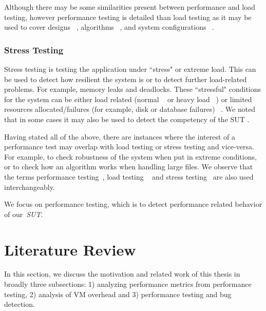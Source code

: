 Although there may be some similarities present between performance and load testing, however performance testing is detailed than load testing as it may be used to cover designs ~\cite{csurgay1999performance,denaro2004early,denaro2005performance}, algorithms ~\cite{cangussu2009segment,cangussu2007reducing}, and system configurations ~\cite{hoskins2005software,pozin2011models,sopitkamol2005method}. 

\subsubsection{Stress Testing}

Stress testing is testing the application under ``stress" or extreme load. This can be used to detect how resilient the system is or to detect further load-related problems. For example, memory leaks and deadlocks. These ``stressful" conditions for the system can be either load related (normal ~\cite{zhang2002automated,kalita2011investigation,chakravarty2010stress} or heavy load ~\cite{Dillenseger2009,kalita2011investigation,huebner2001performance}) or limited resources allocated/failures (for example, disk or database failures) ~\cite{acharya2009mining}. We noted that in some cases it may also be used to detect the competency of the SUT \cite{garousi2010genetic,garousi2008empirical,garousi2006traffic,garousi2008traffic}.


Having stated all of the above, there are instances where the interest of a performance test may overlap with load testing or stress testing and vice-versa. For example, to check robustness of the system when put in extreme conditions, or to check how an algorithm works when handling large files. We observe that the terms performance testing~\cite{Dillenseger2009,Menasce02loadtesting,Menasce:2002}, load testing ~\cite{536461,Bayan:2008,perf_load_stress,perf_web} and stress testing~\cite{Bayan:2008,Yang:1996,4020172} are also used interchangeably. 

We focus on performance testing, which is to detect performance related behavior of our~\textit{SUT}.


\section{Literature Review}
\label{sec:related}
In this section, we discuss the motivation and related work of this thesis in broadly three subsections: 1) analyzing performance metrics from performance testing, 2) analysis of VM overhead and 3) performance testing and bug detection.


